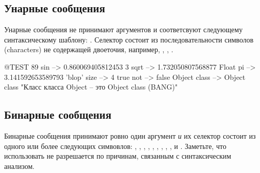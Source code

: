 \documentclass[a4paper,10pt,twoside]{book}
\begin{document}
\subsection{Унарные сообщения}
Унарные сообщения не принимают аргументов и соответсвуют следующему синтаксическому шаблону: . Селектор состоит из последовательности символов (characters) не содержащей двоеточия, например, , , .
\begin{code}{@TEST}
89 sin           --> 0.860069405812453
3 sqrt           --> 1.732050807568877
Float pi         --> 3.141592653589793
'blop' size     --> 4
true not        --> false
Object class --> Object class  "Класс класса Object -- это Object class (BANG)"
\end{code}

\important{Унарные сообщения не принимают аргументов.\\
Они соответствуют синтаксическому шаблону: \lct{получатель \textbf{селектор}}}

\subsection{Бинарные сообщения} 
Бинарные сообщения принимают ровно один аргумент \emph{и} их селектор состоит из одного или более следующих симвовлов: \ct{+}, \ct{-}, \ct{*}, \ct{/}, \ct{&}, \ct{=}, \ct{>}, \ct{|}, \ct{<}, \ct{~} и . Заметьте, что использовать \ct{--} не разрешается по причинам, связанным с синтаксическим анализом.
\end{document}
